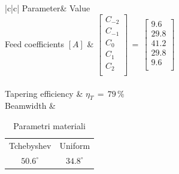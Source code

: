 \documentclass{ieeeojies}
\begin{document}
\begin{table}[bt!]
	\centering
	\begin{tabular}{|c|c|}
		\hline
		{Parameter}& {Value} \\
		\hline
		{Feed coefficients} $[A]$ &  \footnotesize{$\begin{bmatrix}
				C_{-2}\\
				C_{-1}\\
				C_0\\
				C_1\\
				C_2\\
			\end{bmatrix}\,=\,\begin{bmatrix}
				9.6\\
				29.8\\
				41.2\\
				29.8\\
				9.6\\
			\end{bmatrix}$}\\
		\hline 	\\[-1em]
		{Tapering efficiency} & \footnotesize{$\eta_T\,=\,79\,\%$}\\ 
		\hline 
		{Beamwidth} & 
		 \begin{tabular}{c| c}
			{Tchebyshev} & {Uniform} \\
				$50.6^\circ$ &$ 34.8^\circ $ \\
		\end{tabular}  \\
		\hline 
	\end{tabular}

\caption{Parametri materiali}\label{tab:example}
\end{table}
\end{document}

